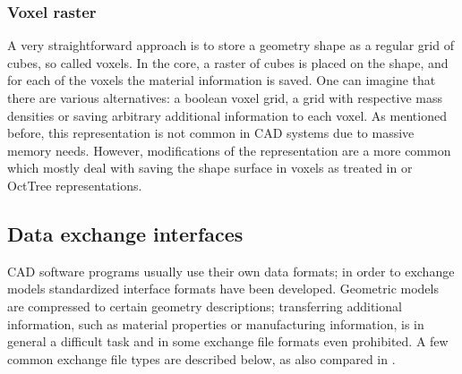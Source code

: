 \subsubsection{Voxel raster}
A very straightforward approach is to store a geometry shape as a regular grid of cubes, so called voxels. In the core, a raster of cubes is placed on the shape, and for each of the voxels the material information is saved. One can imagine that there are various alternatives: a boolean voxel grid, a grid with respective mass densities or saving arbitrary additional information to each voxel. As mentioned before, this representation is not common in CAD systems due to massive memory needs. However, modifications of the representation are a more common which mostly deal with saving the shape surface in voxels as treated in \cite{CohenOr1995} or OctTree representations.  
\subsection{Data exchange interfaces}
\ac{CAD} software programs usually use their own data formats; in order to exchange models standardized interface formats have been developed. Geometric models are compressed to certain geometry descriptions; transferring additional information, such as material properties or manufacturing information, is in general a difficult task and in some exchange file formats even prohibited. A few common exchange file types are described below, as also compared in \cite{STL}.
